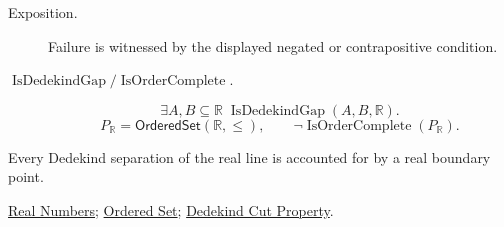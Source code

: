 \begin{remark*}
\begin{description}
  \item[Exposition.]
  Failure is witnessed by the displayed negated or contrapositive condition.

  \item[\(\operatorname{IsDedekindGap} / \operatorname{IsOrderComplete}.\)]
  \[
\exists A,B\subseteq\mathbb{R}\;\operatorname{IsDedekindGap}(A,B,\mathbb{R}).
\]
\[
P_{\mathbb{R}}=\mathsf{OrderedSet}(\mathbb{R},\leq),\qquad
\neg\operatorname{IsOrderComplete}(P_{\mathbb{R}}).
\]
\end{description}
\end{remark*}
\begin{remark*}[Interpretation]
Every Dedekind separation of the real line is accounted for by a real boundary
point.
\end{remark*}
\begin{dependencies}
\hyperref[def:reals]{Real Numbers};
\hyperref[def:ordered-set]{Ordered Set};
\hyperref[thm:dedekind-cut-property]{Dedekind Cut Property}.
\end{dependencies}

